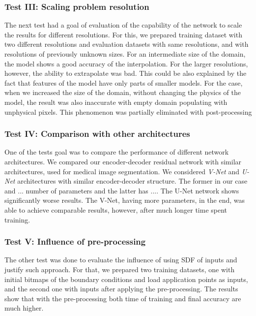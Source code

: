 \subsubsection{Test III: Scaling problem resolution}
The next test had a goal of evaluation of the capability of the network to scale the results for different resolutions.
For this, we prepared training dataset with two different resolutions and evaluation datasets with same resolutions, and with resolutions of previously unknown sizes.
For an intermediate size of the domain, the model shows a good accuracy of the interpolation.
For the larger resolutions, however, the ability to extrapolate was bad.
This could be also explained by the fact that features of the model have only parts of smaller models.
For the case, when we increased the size of the domain, without changing the physics of the model, the result was also inaccurate with empty domain populating with unphysical pixels.
This phenomenon was partially eliminated with post-processing
\medskip

\subsubsection{Test IV: Comparison with other architectures}
One of the tests goal was to compare the performance of different network architectures.
We compared our encoder-decoder residual network with similar architectures, used for medical image segmentation.
We considered \emph{V-Net}\cite{} and \emph{U-Net}\cite{} architectures with similar encoder-decoder structure.
The former in our case and $...$ number of parameters and the latter has $...$.
The U-Net network shows significantly worse results.
The V-Net, having more parameters, in the end, was able to achieve comparable results, however, after much longer time spent training.
\medskip

\subsubsection{Test V: Influence of pre-processing}
The other test was done to evaluate the influence of using SDF of inputs and justify such approach.
For that, we prepared two training datasets, one with initial bitmaps of the boundary conditions and load application points as inputs, and the second one with inputs after applying the pre-processing.
The results show that with the pre-processing both time of training and final accuracy are much higher.
\medskip

